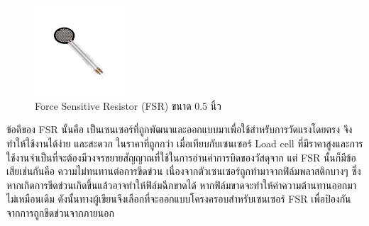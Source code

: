 \begin{figure}[!ht]
  \centering
  \includegraphics[width=0.3\textwidth]{chapter3/images/FSR.jpg}
  \caption{Force Sensitive Resistor (FSR) ขนาด 0.5 นิ้ว}
  \label{fig:FSR}
\end{figure}

ข้อดีของ FSR นั้นคือ เป็นเซนเซอร์ที่ถูกพัฒนาและออกแบบมาเพื่อใช้สำหรับการวัดแรงโดยตรง จึงทำให้ใช้งานได้ง่าย และสะดวก ในราคาที่ถูกกว่า 
เมื่อเทียบกับเซนเซอร์ Load cell ที่มีราคาสูงและการใช้งานจำเป็นที่จะต้องมีวงจรขยายสัญญาณที่ใช้ในการอ่านค่าการบิดของวัสดุจาก 
แต่ FSR นั้นก็มีข้อเสียเช่นกันคือ ความไม่ทนทานต่อการขีดข่วน เนื่องจากตัวเซนเซอร์ถูกทำมาจากฟิล์มพลาสติกบางๆ ซึ่งหากเกิดการขีดข่วนเกิดขึ้นแล้วอาจทำให้ฟิล์มฉีกขาดได้ 
หากฟิล์มขาดจะทำให้ค่าความต้านทานออกมาไม่เหมือนเดิม ดังนั้นทางผู้เขียนจึงเลือกที่จะออกแบบโครงครอบสำหรับเซนเซอร์ FSR เพื่อป้องกันจากการถูกขีดข่วนจากภายนอก







\clearpage
